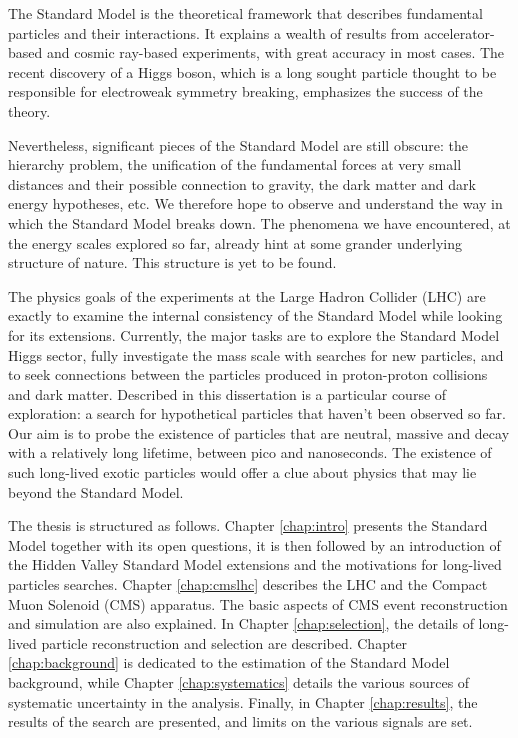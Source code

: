 The Standard Model is the theoretical framework that describes fundamental particles
and their interactions. It explains a wealth of results from accelerator-based
and cosmic ray-based experiments, with great accuracy in most cases.
The recent discovery of a Higgs boson, which is a long sought particle thought to be responsible for
electroweak symmetry 
breaking, emphasizes the success of the theory.

Nevertheless, significant pieces of the Standard Model are still obscure: the hierarchy
problem, the unification of the fundamental forces at very small distances and their possible
connection to gravity, the dark matter and dark energy hypotheses, etc. We therefore hope
to observe and understand the way in which the Standard Model breaks down.
The phenomena we have encountered, at the energy scales explored so far, already
hint at some grander underlying structure of nature. This structure is yet to be found.

The physics goals of the experiments at the Large Hadron Collider (LHC) are exactly to 
examine the internal consistency of the Standard Model while looking for its extensions.
Currently, the major tasks are to explore
the Standard Model Higgs sector, fully investigate the \TeV mass scale with searches
for new particles, and to seek connections between the particles 
produced in proton-proton collisions and dark matter. 
Described in this dissertation is a particular course of exploration: a search for hypothetical
particles that haven't been observed so far. Our aim is to probe the existence of particles
that are neutral, 
massive and decay with a relatively long lifetime, between pico and nanoseconds. The existence
of such long-lived exotic
particles would offer a clue about physics that may lie beyond the Standard Model.

The thesis is structured as follows. Chapter \ref{chap:intro}
 presents the Standard Model together with its
open questions, it is then followed by an introduction of the Hidden Valley Standard 
Model extensions and
 the motivations for long-lived particles searches.
Chapter \ref{chap:cmslhc} describes the LHC and the Compact Muon Solenoid (CMS) apparatus.
The basic aspects of CMS event reconstruction and simulation are also explained.
In Chapter \ref{chap:selection},
the details of long-lived particle reconstruction and selection are described. 
Chapter \ref{chap:background} is dedicated to the estimation of the Standard Model
 background, while Chapter
\ref{chap:systematics} details the various sources of systematic uncertainty in the analysis.
Finally, in Chapter \ref{chap:results}, the results of the search are presented, 
and limits on the various signals are set. 

